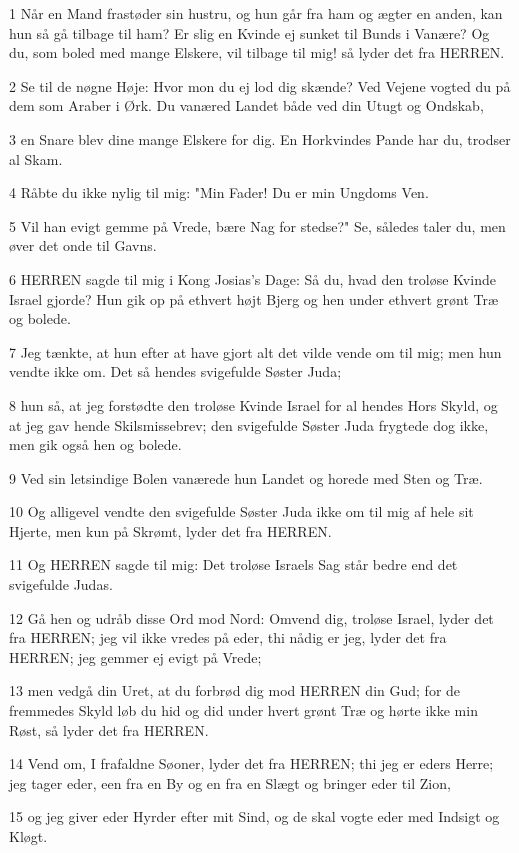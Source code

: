 \par 1 Når en Mand frastøder sin hustru, og hun går fra ham og ægter en anden, kan hun så gå tilbage til ham? Er slig en Kvinde ej sunket til Bunds i Vanære? Og du, som boled med mange Elskere, vil tilbage til mig! så lyder det fra HERREN.
\par 2 Se til de nøgne Høje: Hvor mon du ej lod dig skænde? Ved Vejene vogted du på dem som Araber i Ørk. Du vanæred Landet både ved din Utugt og Ondskab,
\par 3 en Snare blev dine mange Elskere for dig. En Horkvindes Pande har du, trodser al Skam.
\par 4 Råbte du ikke nylig til mig: "Min Fader! Du er min Ungdoms Ven.
\par 5 Vil han evigt gemme på Vrede, bære Nag for stedse?" Se, således taler du, men øver det onde til Gavns.
\par 6 HERREN sagde til mig i Kong Josias's Dage: Så du, hvad den troløse Kvinde Israel gjorde? Hun gik op på ethvert højt Bjerg og hen under ethvert grønt Træ og bolede.
\par 7 Jeg tænkte, at hun efter at have gjort alt det vilde vende om til mig; men hun vendte ikke om. Det så hendes svigefulde Søster Juda;
\par 8 hun så, at jeg forstødte den troløse Kvinde Israel for al hendes Hors Skyld, og at jeg gav hende Skilsmissebrev; den svigefulde Søster Juda frygtede dog ikke, men gik også hen og bolede.
\par 9 Ved sin letsindige Bolen vanærede hun Landet og horede med Sten og Træ.
\par 10 Og alligevel vendte den svigefulde Søster Juda ikke om til mig af hele sit Hjerte, men kun på Skrømt, lyder det fra HERREN.
\par 11 Og HERREN sagde til mig: Det troløse Israels Sag står bedre end det svigefulde Judas.
\par 12 Gå hen og udråb disse Ord mod Nord: Omvend dig, troløse Israel, lyder det fra HERREN; jeg vil ikke vredes på eder, thi nådig er jeg, lyder det fra HERREN; jeg gemmer ej evigt på Vrede;
\par 13 men vedgå din Uret, at du forbrød dig mod HERREN din Gud; for de fremmedes Skyld løb du hid og did under hvert grønt Træ og hørte ikke min Røst, så lyder det fra HERREN.
\par 14 Vend om, I frafaldne Søoner, lyder det fra HERREN; thi jeg er eders Herre; jeg tager eder, een fra en By og en fra en Slægt og bringer eder til Zion,
\par 15 og jeg giver eder Hyrder efter mit Sind, og de skal vogte eder med Indsigt og Kløgt.
